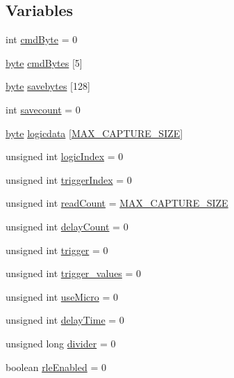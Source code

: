 \subsection*{Variables}
\begin{DoxyCompactItemize}
\item 
int \hyperlink{logic__analyzer_8ino_a12614e45101c87be446e3215f9828ea7}{cmd\-Byte} = 0
\item 
\hyperlink{Arduino_8h_ab8ef12fab634c171394422d0ee8baf94}{byte} \hyperlink{logic__analyzer_8ino_a1c084ba1cb81467fe3909061a10bcc3c}{cmd\-Bytes} \mbox{[}5\mbox{]}
\item 
\hyperlink{Arduino_8h_ab8ef12fab634c171394422d0ee8baf94}{byte} \hyperlink{logic__analyzer_8ino_a244e6b00c44167b679f20c536bbfd847}{savebytes} \mbox{[}128\mbox{]}
\item 
int \hyperlink{logic__analyzer_8ino_a6082b63b4ed702f0c1c36683dfeedffd}{savecount} = 0
\item 
\hyperlink{Arduino_8h_ab8ef12fab634c171394422d0ee8baf94}{byte} \hyperlink{logic__analyzer_8ino_acf1380cc8a402895cf2cbab1a4892637}{logicdata} \mbox{[}\hyperlink{logic__analyzer_8ino_a9fc5489cac12001b6bd8f4327f19d8d3}{M\-A\-X\-\_\-\-C\-A\-P\-T\-U\-R\-E\-\_\-\-S\-I\-Z\-E}\mbox{]}
\item 
unsigned int \hyperlink{logic__analyzer_8ino_a3ebca88c99ad4e7a44e7c1a15f70d7b9}{logic\-Index} = 0
\item 
unsigned int \hyperlink{logic__analyzer_8ino_a5c00415a1614fd9a8ec4d81709ab7a7c}{trigger\-Index} = 0
\item 
unsigned int \hyperlink{logic__analyzer_8ino_ad309c26233a404465e486cc0b1708c8e}{read\-Count} = \hyperlink{logic__analyzer_8ino_a9fc5489cac12001b6bd8f4327f19d8d3}{M\-A\-X\-\_\-\-C\-A\-P\-T\-U\-R\-E\-\_\-\-S\-I\-Z\-E}
\item 
unsigned int \hyperlink{logic__analyzer_8ino_a2d69e43680dd22a35c730441112093a9}{delay\-Count} = 0
\item 
unsigned int \hyperlink{logic__analyzer_8ino_a820e779c394d2a64ab63e7e22420a616}{trigger} = 0
\item 
unsigned int \hyperlink{logic__analyzer_8ino_a494f85c7857b64451b04ff698085f6bf}{trigger\-\_\-values} = 0
\item 
unsigned int \hyperlink{logic__analyzer_8ino_a30066e7c1bf76953fc46a9c9bc1923ab}{use\-Micro} = 0
\item 
unsigned int \hyperlink{logic__analyzer_8ino_a7348932029d885adc020c5d1ddc29274}{delay\-Time} = 0
\item 
unsigned long \hyperlink{logic__analyzer_8ino_ae9918e26621a8ce8e42f3dc43a92c6c9}{divider} = 0
\item 
boolean \hyperlink{logic__analyzer_8ino_ad62ab2989a5832746d168d644991f20a}{rle\-Enabled} = 0
\end{DoxyCompactItemize}


